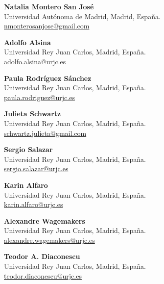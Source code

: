 \documentclass[11pt,a4paper]{article}
\begin{document}
\medskip

\noindent
\textbf{Natalia Montero San José}\\
Universidad Autónoma de Madrid, Madrid, España.\\
\href{mailto:nmonterosanjose@gmail.com}
     {nmonterosanjose@gmail.com}

\medskip

\noindent
\textbf{Adolfo Alsina}\\
Universidad Rey Juan Carlos, Madrid, España.\\
\href{mailto:adolfo.alsina@urjc.es}
     {adolfo.alsina@urjc.es}

\medskip

\noindent
\textbf{Paula Rodríguez Sánchez}\\
Universidad Rey Juan Carlos, Madrid, España.\\
\href{mailto:paula.rodriguez@urjc.es}
     {paula.rodriguez@urjc.es}

\medskip

\noindent
\textbf{Julieta Schwartz}\\
Universidad Rey Juan Carlos, Madrid, España.\\
\href{mailto:schwartz.julieta@gmail.com}
     {schwartz.julieta@gmail.com}

\medskip

\noindent
\textbf{Sergio Salazar}\\
Universidad Rey Juan Carlos, Madrid, España.\\
\href{mailto:sergio.salazar@urjc.es}
     {sergio.salazar@urjc.es}

\medskip

\noindent
\textbf{Karin Alfaro}\\
Universidad Rey Juan Carlos, Madrid, España.\\
\href{mailto:karin.alfaro@urjc.es}
     {karin.alfaro@urjc.es}

\medskip

\noindent
\textbf{Alexandre Wagemakers}\\
Universidad Rey Juan Carlos, Madrid, España.\\
\href{mailto:alexandre.wagemakers@urjc.es}
     {alexandre.wagemakers@urjc.es}

\medskip

\noindent
\textbf{Teodor A. Diaconescu}\\
Universidad Rey Juan Carlos, Madrid, España.\\
\href{mailto:teodor.diaconescu@urjc.es}
     {teodor.diaconescu@urjc.es}
\end{document}
